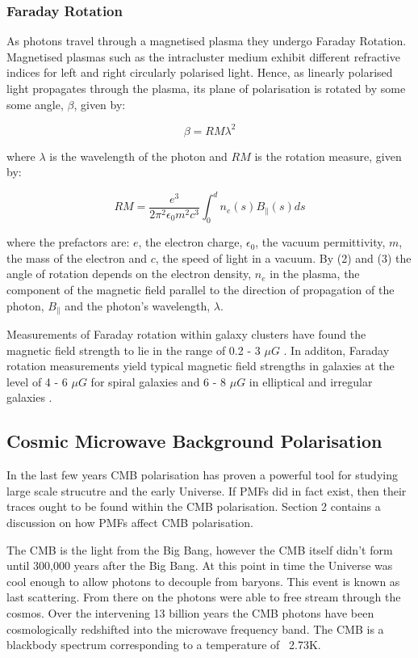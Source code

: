 \subsubsection{Faraday Rotation}

As photons travel through a magnetised plasma they undergo Faraday Rotation. Magnetised plasmas such as the intracluster medium exhibit different refractive indices for left and right circularly polarised light. Hence, as linearly polarised light propagates through the plasma, its plane of polarisation is rotated by some some angle, $\beta$, given by:

\begin{equation}
\beta = RM\lambda^2
\end{equation}

where $\lambda$ is the wavelength of the photon and $RM$ is the rotation measure, given by:

\begin{equation}
RM = \frac{e^3}{2\pi ^2 \epsilon_0 m^2 c^3}\int_{0}^{d} n_e(s) B_{\|}(s) ds
\end{equation}

where the prefactors are: $e$, the electron charge, $\epsilon_0$, the vacuum permittivity, $m$, the mass of the electron and $c$, the speed of light in a vacuum. By (2) and (3) the angle of rotation depends on the electron density, $n_e$ in the plasma, the component of the magnetic field parallel to the direction of propagation of the photon, $B_{\|}$ and the photon's wavelength, $\lambda$.

Measurements of Faraday rotation within galaxy clusters have found the magnetic field strength to lie in the range of 0.2 - 3 $\mu G$ \citep{Widrow:2002ud}. In additon, Faraday rotation measurements yield typical magnetic field strengths in galaxies at the level of 4 - 6 $\mu G$ for spiral galaxies and 6 - 8 $\mu G$ in elliptical and irregular galaxies \citep{Widrow:2002ud}.

\subsection{Cosmic Microwave Background Polarisation}
In the last few years CMB polarisation has proven a powerful tool for studying large scale strucutre and the early Universe. If PMFs did in fact exist, then their traces ought to be found within the CMB polarisation. Section 2 contains a discussion on how PMFs affect CMB polarisation.

The CMB is the light from the Big Bang, however the CMB itself didn't form until 300,000 years after the Big Bang. At this point in time the Universe was cool enough to allow photons to decouple from baryons. This event is known as last scattering. From there on the photons were able to free stream through the cosmos. Over the intervening 13 billion years the CMB photons have been cosmologically redshifted into the microwave frequency band. The CMB is a blackbody spectrum corresponding to a temperature of ~2.73K.

